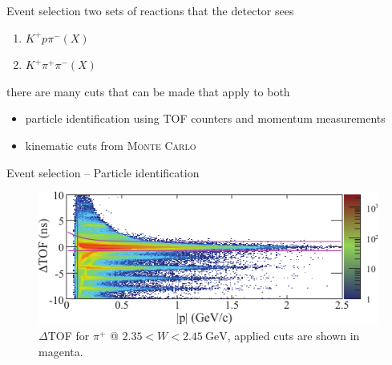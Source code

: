 \documentclass[11pt,aspectratio=1610,dvipsnames]{beamer}
\begin{document}
\begin{frame}{Event selection}
two sets of reactions that the detector sees
	
	\begin{enumerate}
		\item $K^+p\pi^-(X)$
		\item $K^+\pi^+\pi^-(X)$
	\end{enumerate}
there are many cuts that can be made that apply to both
	\begin{tcolorbox}[colback=black!10,colframe=gray!20!black,title=Initial selection of particles] 
		\begin{itemize}
			\item particle identification using TOF counters and momentum measurements
			\item kinematic cuts from \textsc{Monte Carlo}
			
		\end{itemize}
	\end{tcolorbox}
\end{frame}
\begin{frame}{Event selection -- Particle identification}
\begin{figure}
	\centering
	\includegraphics[width=\linewidth]{tof_pi}
	\caption*{$\Delta$TOF for $\pi^+$ @ $2.35 < W < \SI{2.45}{\giga\eV}$, applied cuts are shown in magenta. \citet{lineshapes}}
\end{figure}
\end{frame}
\end{document}
